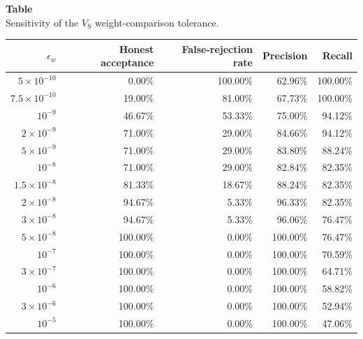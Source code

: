\noindent\begin{minipage}{\textwidth}
\label{tab:appendix_v1_sensitivity}
\textbf{Table~\thetable}\\
Sensitivity of the $V_{\mathrm{S}}$ weight-comparison tolerance.
\par\smallskip
\centering
\scriptsize
\setlength{\tabcolsep}{4pt}
\renewcommand{\arraystretch}{1.05}
\begin{tabular}{rrrrr}
\toprule
$\epsilon_w$ & Honest acceptance & False-rejection rate & Precision & Recall \\
\midrule
$5\!\times\!10^{-10}$ & 0.00\% & 100.00\% & 62.96\% & 100.00\% \\
$7.5\!\times\!10^{-10}$ & 19.00\% & 81.00\% & 67.73\% & 100.00\% \\
$10^{-9}$ & 46.67\% & 53.33\% & 75.00\% & 94.12\% \\
$2\!\times\!10^{-9}$ & 71.00\% & 29.00\% & 84.66\% & 94.12\% \\
$5\!\times\!10^{-9}$ & 71.00\% & 29.00\% & 83.80\% & 88.24\% \\
$10^{-8}$ & 71.00\% & 29.00\% & 82.84\% & 82.35\% \\
$1.5\!\times\!10^{-8}$ & 81.33\% & 18.67\% & 88.24\% & 82.35\% \\
$2\!\times\!10^{-8}$ & 94.67\% & 5.33\% & 96.33\% & 82.35\% \\
$3\!\times\!10^{-8}$ & 94.67\% & 5.33\% & 96.06\% & 76.47\% \\
$5\!\times\!10^{-8}$ & 100.00\% & 0.00\% & 100.00\% & 76.47\% \\
$10^{-7}$ & 100.00\% & 0.00\% & 100.00\% & 70.59\% \\
$3\!\times\!10^{-7}$ & 100.00\% & 0.00\% & 100.00\% & 64.71\% \\
$10^{-6}$ & 100.00\% & 0.00\% & 100.00\% & 58.82\% \\
$3\!\times\!10^{-6}$ & 100.00\% & 0.00\% & 100.00\% & 52.94\% \\
$10^{-5}$ & 100.00\% & 0.00\% & 100.00\% & 47.06\% \\
\bottomrule
\end{tabular}
\end{minipage}

